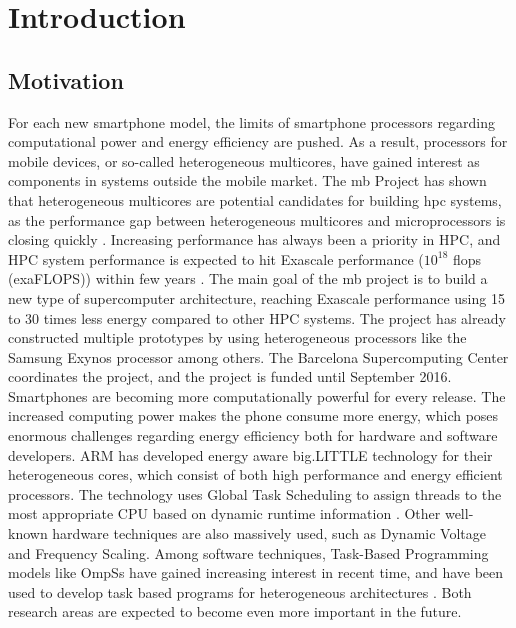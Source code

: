 \chapter{Introduction}

\section{Motivation}
\label{sec:mot}
For each new smartphone model, the limits of smartphone processors regarding computational power and energy efficiency are pushed. As a result, processors for mobile devices, or so-called heterogeneous multicores, have gained interest as components in systems outside the mobile market. The \gls{mb} Project \cite{MB} has shown that heterogeneous multicores are potential candidates for building \gls{hpc} systems, as the performance gap between heterogeneous multicores and microprocessors is closing quickly \cite{a:MB:Raj13}. Increasing performance has always been a priority in HPC, and HPC system performance is expected to hit Exascale performance ($10^{18}$ \gls{flops} (exaFLOPS)) within few years \cite{TOP500}. The main goal of the \gls{mb} project is to build a new type of supercomputer architecture, reaching Exascale performance using 15 to 30 times less energy compared to other HPC systems. The project has already constructed multiple prototypes by using heterogeneous processors like the Samsung Exynos \cite{EXY} processor among others. The Barcelona Supercomputing Center coordinates the project, and the project is funded until September 2016. \\

Smartphones are becoming more computationally powerful for every release. The increased computing power makes the phone consume more energy, which poses enormous challenges regarding energy efficiency both for hardware and software developers. ARM has developed energy aware big.LITTLE technology for their heterogeneous cores, which consist of both high performance and energy efficient processors. The technology uses Global Task Scheduling to assign threads to the most appropriate CPU based on dynamic runtime information \cite{a:ARM:bL}. Other well-known hardware techniques are also massively used, such as Dynamic Voltage and Frequency Scaling. Among software techniques, Task-Based Programming models like OmpSs \cite{a:ompss2013} have gained increasing interest in recent time, and have been used to develop task based programs for heterogeneous architectures \cite{a:Lien2012}. Both research areas are expected to become even more important in the future. \\

